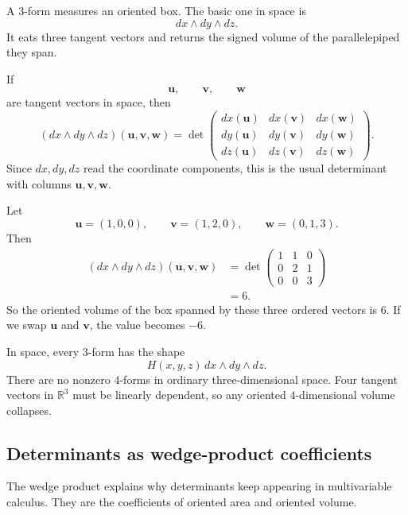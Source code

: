A \(3\)-form measures an oriented box.  The basic one in space is
\[
    dx\wedge dy\wedge dz.
\]
It eats three tangent vectors and returns the signed volume of the parallelepiped they
span.

If
\[
    \mathbf u,\qquad \mathbf v,\qquad \mathbf w
\]
are tangent vectors in space, then
\[
\boxed{
    (dx\wedge dy\wedge dz)(\mathbf u,\mathbf v,\mathbf w)
    =
    \det
    \begin{pmatrix}
        dx(\mathbf u)&dx(\mathbf v)&dx(\mathbf w)\\
        dy(\mathbf u)&dy(\mathbf v)&dy(\mathbf w)\\
        dz(\mathbf u)&dz(\mathbf v)&dz(\mathbf w)
    \end{pmatrix}.
}
\]
Since \(dx,dy,dz\) read the coordinate components, this is the usual determinant with
columns \(\mathbf u,\mathbf v,\mathbf w\).

\begin{example}
Let
\[
    \mathbf u=(1,0,0),
    \qquad
    \mathbf v=(1,2,0),
    \qquad
    \mathbf w=(0,1,3).
\]
Then
\[
\begin{aligned}
    (dx\wedge dy\wedge dz)(\mathbf u,\mathbf v,\mathbf w)
    &=
    \det
    \begin{pmatrix}
        1&1&0\\
        0&2&1\\
        0&0&3
    \end{pmatrix}\\
    &=
    6.
\end{aligned}
\]
So the oriented volume of the box spanned by these three ordered vectors is \(6\).
If we swap \(\mathbf u\) and \(\mathbf v\), the value becomes \(-6\).
\end{example}

In space, every \(3\)-form has the shape
\[
\boxed{
    H(x,y,z)\,dx\wedge dy\wedge dz.
}
\]
There are no nonzero \(4\)-forms in ordinary three-dimensional space.  Four tangent
vectors in \(\mathbb R^3\) must be linearly dependent, so any oriented \(4\)-dimensional
volume collapses.

\subsection{Determinants as wedge-product coefficients}

The wedge product explains why determinants keep appearing in multivariable calculus.
They are the coefficients of oriented area and oriented volume.

